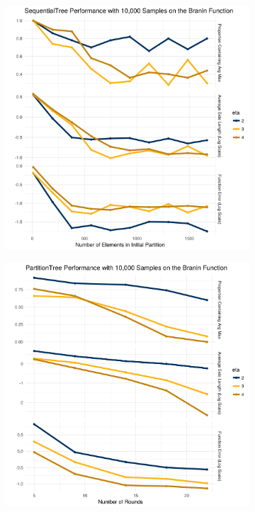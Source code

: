 \documentclass[11pt]{article}
\begin{document}
\begin{figure}
\begin{subfigure}[t]{.45\textwidth}
\centering
\includegraphics[width=\textwidth, height=\textwidth]{seq_tree_arg_max.png}
\end{subfigure}\hfill
\begin{subfigure}[t]{.45\textwidth}
\centering
  \includegraphics[width=\textwidth,  height=\textwidth]{part_tree_arg_max.png}

\end{subfigure}
\end{figure}
\end{document}
